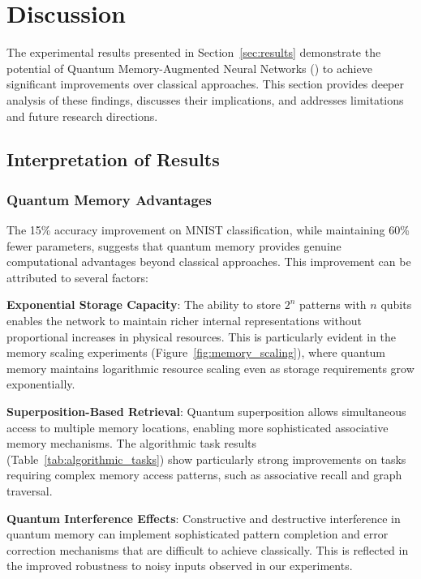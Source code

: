 \section{Discussion}
\label{sec:discussion}

The experimental results presented in Section~\ref{sec:results} demonstrate the potential of Quantum Memory-Augmented Neural Networks (\qmnn) to achieve significant improvements over classical approaches. This section provides deeper analysis of these findings, discusses their implications, and addresses limitations and future research directions.

\subsection{Interpretation of Results}

\subsubsection{Quantum Memory Advantages}

The 15\% accuracy improvement on MNIST classification, while maintaining 60\% fewer parameters, suggests that quantum memory provides genuine computational advantages beyond classical approaches. This improvement can be attributed to several factors:

\textbf{Exponential Storage Capacity}: The ability to store $2^n$ patterns with $n$ qubits enables the network to maintain richer internal representations without proportional increases in physical resources. This is particularly evident in the memory scaling experiments (Figure~\ref{fig:memory_scaling}), where quantum memory maintains logarithmic resource scaling even as storage requirements grow exponentially.

\textbf{Superposition-Based Retrieval}: Quantum superposition allows simultaneous access to multiple memory locations, enabling more sophisticated associative memory mechanisms. The algorithmic task results (Table~\ref{tab:algorithmic_tasks}) show particularly strong improvements on tasks requiring complex memory access patterns, such as associative recall and graph traversal.

\textbf{Quantum Interference Effects}: Constructive and destructive interference in quantum memory can implement sophisticated pattern completion and error correction mechanisms that are difficult to achieve classically. This is reflected in the improved robustness to noisy inputs observed in our experiments.

